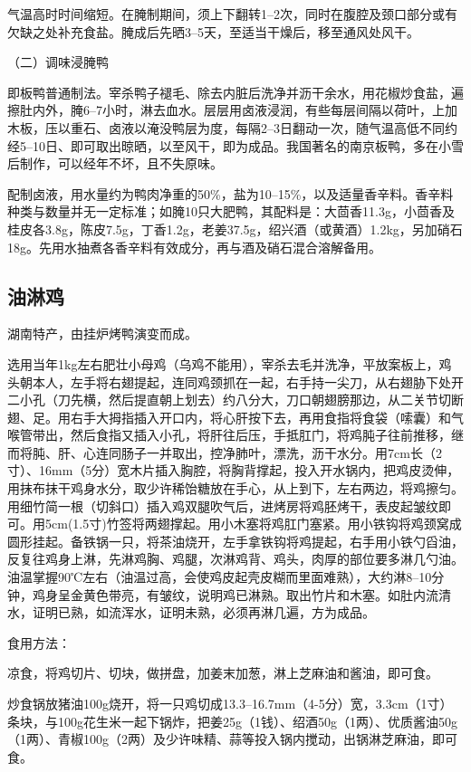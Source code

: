 \documentclass{ctexbook}
\begin{document}
气温高时时间缩短。在腌制期间，须上下翻转1--2次，同时在腹腔及颈口部分或有欠缺之处补充食盐。腌成后先晒3--5天，至适当干燥后，移至通风处风干。

（二）调味浸腌鸭

即板鸭普通制法。宰杀鸭子褪毛、除去内脏后洗净并沥干余水，用花椒炒食盐，遍擦肚内外，腌6--7小时，淋去血水。层层用卤液浸润，有些每层间隔以荷叶，上加木板，压以重石、卤液以淹没鸭层为度，每隔2--3日翻动一次，随气温高低不同约经5--10日、即可取出晾晒，以至风干，即为成品。我国著名的南京板鸭，多在小雪后制作，可以经年不坏，且不失原味。

配制卤液，用水量约为鸭肉净重的50\%，盐为10--15\%，以及适量香辛料。香辛料种类与数量并无一定标准；如腌10只大肥鸭，其配料是：大茴香11.3g，小茴香及桂皮各3.8g，陈皮7.5g，丁香1.2g，老姜37.5g，绍兴酒（或黄酒）1.2kg，另加硝石18g。先用水抽煮各香辛料有效成分，再与酒及硝石混合溶解备用。
\subsection{油淋鸡}
湖南特产，由挂炉烤鸭演变而成。

选用当年1kg左右肥壮小母鸡（乌鸡不能用），宰杀去毛并洗净，平放案板上，鸡头朝本人，左手将右翅提起，连同鸡颈抓在一起，右手持一尖刀，从右翅胁下处开二小孔（刀先横，然后提直朝上划去）约八分大，刀口朝翅膀那边，从二关节切断翅、足。用右手大拇指插入开口内，将心肝按下去，再用食指将食袋（嗦囊）和气喉管带出，然后食指又插入小孔，将肝往后压，手抵肛门，将鸡肫子往前推移，继而将肫、肝、心连同肠子一并取出，控净肺叶，漂洗，沥干水分。用7cm长（2寸）、16mm（5分）宽木片插入胸腔，将胸背撑起，投入开水锅内，把鸡皮烫伸，用抹布抹干鸡身水分，取少许稀饴糖放在手心，从上到下，左右两边，将鸡擦匀。用细竹简一根（切斜口）插入鸡双腿吹气后，进烤房将鸡胚烤干，表皮起皱纹即可。用5cm(1.5寸)竹签将两翅撑起。用小木塞将鸡肛门塞紧。用小铁钩将鸡颈窝成圆形挂起。备铁锅一只，将茶油烧开，左手拿铁钩将鸡提起，右手用小铁勺舀油，反复往鸡身上淋，先淋鸡胸、鸡腿，次淋鸡背、鸡头，肉厚的部位要多淋几勺油。油温掌握90℃左右（油温过高，会使鸡皮起壳皮糊而里面难熟），大约淋8--10分钟，鸡身呈金黄色带亮，有皱纹，说明鸡已淋熟。取出竹片和木塞。如肚内流清水，证明已熟，如流浑水，证明未熟，必须再淋几遍，方为成品。

食用方法：

凉食，将鸡切片、切块，做拼盘，加姜末加葱，淋上芝麻油和酱油，即可食。

炒食锅放猪油100g烧开，将一只鸡切成13.3--16.7mm（4-5分）宽，3.3cm（1寸）条块，与100g花生米一起下锅炸，把姜25g（1钱）、绍酒50g（1两）、优质酱油50g（1两）、青椒100g（2两）及少许味精、蒜等投入锅内搅动，出锅淋芝麻油，即可食。
\end{document}
